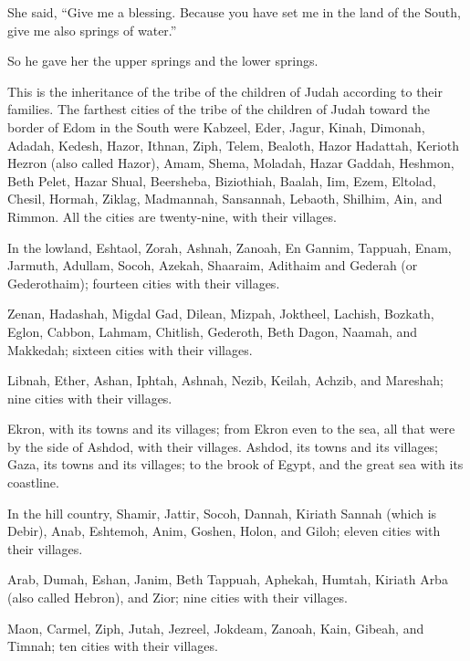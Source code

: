 \myverse{}She said, “Give me a blessing. Because you have set me in the
land of the South, give me also springs of water.”

So he gave her the upper springs and the lower springs.

\myverse{}This is the inheritance of the tribe of the children of Judah
according to their families.
\myverse{}The farthest cities of the tribe of the children of Judah toward the border
of Edom in the South were Kabzeel, Eder, Jagur,
\myverse{}Kinah, Dimonah, Adadah,
\myverse{}Kedesh, Hazor, Ithnan,
\myverse{}Ziph, Telem, Bealoth,
\myverse{}Hazor Hadattah, Kerioth Hezron (also called Hazor),
\myverse{}Amam, Shema, Moladah,
\myverse{}Hazar Gaddah, Heshmon, Beth Pelet,
\myverse{}Hazar Shual, Beersheba, Biziothiah,
\myverse{}Baalah, Iim, Ezem,
\myverse{}Eltolad, Chesil, Hormah,
\myverse{}Ziklag, Madmannah, Sansannah,
\myverse{}Lebaoth, Shilhim, Ain, and Rimmon. All the cities are twenty-nine, with their
villages.

\myverse{}In the lowland, Eshtaol, Zorah, Ashnah,
\myverse{}Zanoah, En Gannim, Tappuah, Enam,
\myverse{}Jarmuth, Adullam, Socoh, Azekah,
\myverse{}Shaaraim, Adithaim and Gederah (or Gederothaim); fourteen cities with their
villages.

\myverse{}Zenan, Hadashah, Migdal Gad,
\myverse{}Dilean, Mizpah, Joktheel,
\myverse{}Lachish, Bozkath, Eglon,
\myverse{}Cabbon, Lahmam, Chitlish,
\myverse{}Gederoth, Beth Dagon, Naamah, and Makkedah; sixteen cities with their villages.

\myverse{}Libnah, Ether, Ashan,
\myverse{}Iphtah, Ashnah, Nezib,
\myverse{}Keilah, Achzib, and Mareshah; nine cities with their villages.

\myverse{}Ekron, with its towns and its villages;
\myverse{}from Ekron even to the sea, all that were by the side of Ashdod, with their
villages.
\myverse{}Ashdod, its towns and its villages; Gaza, its towns and its villages; to
the brook of Egypt, and the great sea with its coastline.

\myverse{}In the hill country, Shamir, Jattir, Socoh,
\myverse{}Dannah, Kiriath Sannah (which is Debir),
\myverse{}Anab, Eshtemoh, Anim,
\myverse{}Goshen, Holon, and Giloh; eleven cities with their villages.

\myverse{}Arab, Dumah, Eshan,
\myverse{}Janim, Beth Tappuah, Aphekah,
\myverse{}Humtah, Kiriath Arba (also called Hebron), and Zior; nine cities with their
villages.

\myverse{}Maon, Carmel, Ziph, Jutah,
\myverse{}Jezreel, Jokdeam, Zanoah,
\myverse{}Kain, Gibeah, and Timnah; ten cities with their villages.

